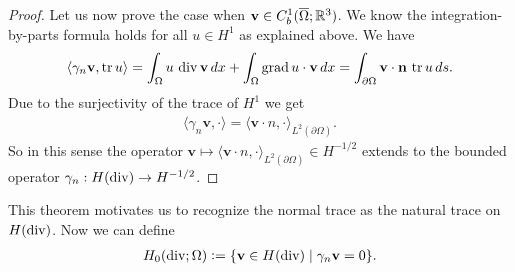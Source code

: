\documentclass[../main.tex]{subfiles}
\begin{document}
\begin{proof}
    Let us now prove the case when $\mathbf{v} \in C_b^1(\overline{\Omega}; \mathbb{R}^3)$.
    We know the integration-by-parts formula holds for all $u \in H^1$ as 
    explained above. We have
    \begin{align*}
        \langle \gamma_n \mathbf{v}, \operatorname{tr} u \rangle = 
        \int_\Omega u \, \operatorname{div} \mathbf{v} \, dx 
            + \int_\Omega \operatorname{grad} u \cdot \mathbf{v} \, dx
        = \int_{\partial \Omega} \mathbf{v}\cdot \mathbf{n} \, \operatorname{tr} u \, ds.
    \end{align*}
    Due to the surjectivity of the trace of $H^1$ we get 
    \begin{align*}
        \langle \gamma_n \mathbf{v}, \cdot \rangle = \langle \mathbf{v} \cdot n, \cdot \rangle_{L^2(\partial\Omega)}.
    \end{align*}
    So in this sense the operator $\mathbf{v} \mapsto \langle \mathbf{v} \cdot n, \cdot \rangle_{L^2(\partial\Omega)} 
    \in H^{-1/2}$ extends to the bounded operator $\gamma_n: H(\operatorname{div}) \rightarrow H^{-1/2}$.
\end{proof}
This theorem motivates us to recognize the normal trace as the natural trace 
on $H(\operatorname{div})$. Now we can define 
\begin{align*}
    H_0(\operatorname{div};\Omega) \vcentcolon= \{ \mathbf{v} \in H(\operatorname{div}) \mid \gamma_n \mathbf{v}=0 \}.
\end{align*}

\end{document}
